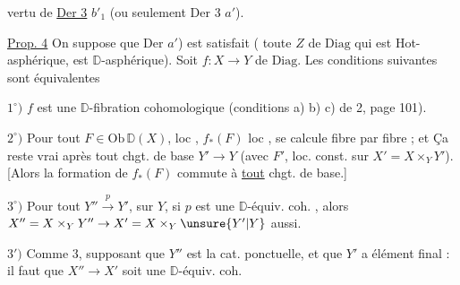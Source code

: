 

vertu de \uline{Der 3} $b'_1$ (ou seulement Der 3 $a'$).


\uline{Prop. 4} On suppose que Der $a'$) est satisfait ( toute $Z$ de $\mathrm{Diag}$ qui est Hot-asphérique, est  $\mathbb D$-asphérique). Soit $f:X\to Y$ de $\mathrm{Diag}$. Les conditions suivantes sont équivalentes

$1^\circ)$ $f$ est une $\mathbb D$-fibration cohomologique  (conditions a) b) c) de  2, page 101).

$2^\circ)$ Pour tout $F\in\mathrm{Ob}\,\mathbb D(X)$, loc , $f_*(F)$  loc , se calcule fibre par fibre ; et Ça reste vrai après tout chgt. de base $Y'\to Y$ (avec $F'$, loc. const. sur $X'=X\times_Y Y'$). [Alors la formation de $f_*(F)$ commute à \uline{tout} chgt. de base.]

$3^\circ)$ Pour tout $Y''\overset{p}{\longrightarrow}Y'$, sur $Y$, si $p$ est une $\mathbb D$-équiv. coh. , alors $X''=X\times_Y Y''\to X'=X\times_Y\unsure{Y'|Y}$ aussi.

$3')$ Comme 3,  supposant que $Y''$ est la cat. ponctuelle, et que $Y'$ a  élément final :  il faut que $X''\to X'$ soit une $\mathbb D$-équiv. coh.

